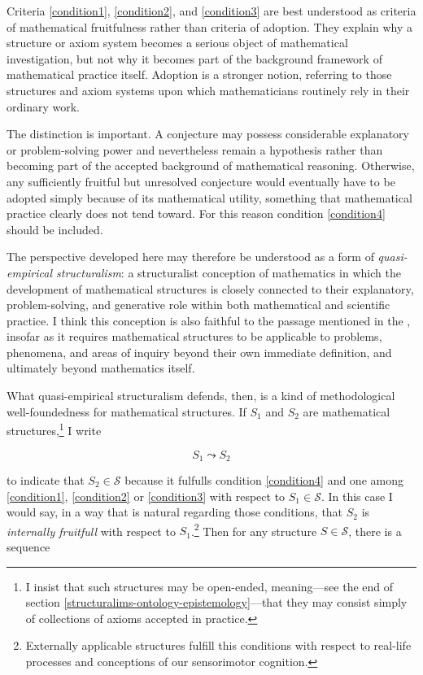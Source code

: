 \documentclass[11pt,a4paper]{article}
\begin{document}
Criteria \ref{condition1}, \ref{condition2}, and \ref{condition3} are best understood as criteria of mathematical fruitfulness rather than criteria of adoption. They explain why a structure or axiom system becomes a serious object of mathematical investigation, but not why it becomes part of the background framework of mathematical practice itself. Adoption is a stronger notion, referring to those structures and axiom systems upon which mathematicians routinely rely in their ordinary work.

The distinction is important. A conjecture may possess considerable explanatory or problem-solving power and nevertheless remain a hypothesis rather than becoming part of the accepted background of mathematical reasoning. Otherwise, any sufficiently fruitful but unresolved conjecture would eventually have to be adopted simply because of its mathematical utility, something that mathematical practice clearly does not tend toward. For this reason condition \ref{condition4} should be included.

The perspective developed here may therefore be understood as a form of \textit{quasi-empirical structuralism}: a structuralist conception of mathematics in which the development of mathematical structures is closely connected to their explanatory, problem-solving, and generative role within both mathematical and scientific practice. I think this conception is also faithful to the \textcite{Wittgenstein1978} passage mentioned in the , insofar as it requires mathematical structures to be applicable to problems, phenomena, and areas of inquiry beyond their own immediate definition, and ultimately beyond mathematics itself.

What quasi-empirical structuralism defends, then, is a kind of methodological well-foundedness for mathematical structures. If $S_1$ and $S_2$ are mathematical structures,\footnote{I insist that such structures may be open-ended, meaning—see the end of section \ref{structuralims-ontology-epistemology}—that they may consist simply of collections of axioms accepted in practice.} I write 

$$S_1 \leadsto S_2 $$

to indicate that $S_2 \in \mathcal{S}$ because it fulfulls condition \ref{condition4} and one among \ref{condition1}, \ref{condition2} or \ref{condition3} with respect to $S_1 \in \mathcal{S}$. In this case I would say, in a way that is natural regarding those conditions, that $S_2$ is \textit{internally fruitfull} with respect to $S_1$.\footnote{Externally applicable structures fulfill this conditions with respect to real-life processes and conceptions of our sensorimotor cognition.} Then for any structure $S \in \mathcal{S}$, there is a sequence 
\end{document}
